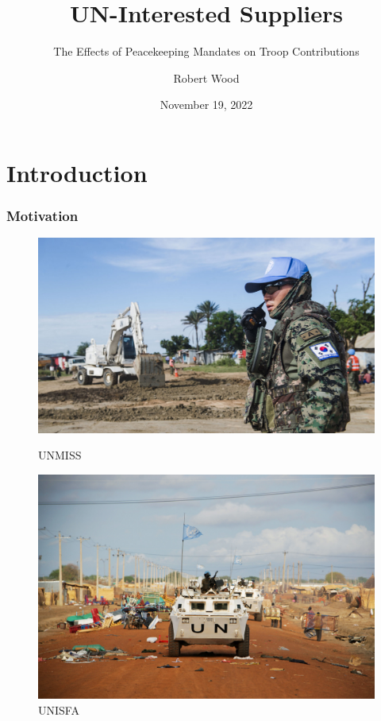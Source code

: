 \documentclass{beamer}
\title{UN-Interested Suppliers}
\subtitle{The Effects of Peacekeeping Mandates on Troop Contributions}
\author{Robert Wood}
\institute{University of Kentucky}
\date{November 19, 2022}
\begin{document}
\section{Introduction}


\begin{frame}
\titlepage
\end{frame}


\begin{frame}
\frametitle{Motivation}

\begin{figure}
\centering
\begin{minipage}{.5\textwidth}
  \centering
  \includegraphics[width=.80\linewidth]{UNMISS.jpg}
  \caption{UNMISS}
  \label{fig:test1}
\end{minipage}%
\begin{minipage}{.5\textwidth}
  \centering
  \includegraphics[width=.75\linewidth]{UNISFA.jpg}
  \caption{UNISFA}
  \label{fig:test2}
\end{minipage}
\end{figure}

\vspace{0.5cm}


\end{frame}
\end{document}
